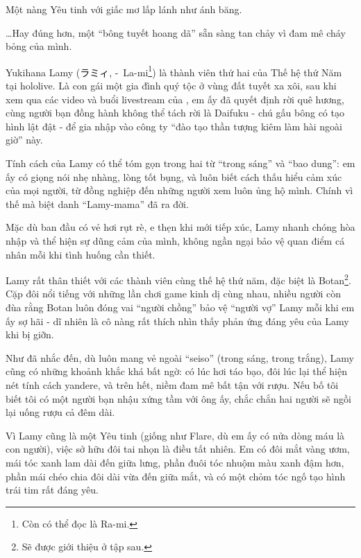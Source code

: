 \documentclass[../main.tex]{subfiles}
\begin{document}
Một nàng Yêu tinh với giấc mơ lấp lánh như ánh băng.

\dots Hay đúng hơn, một ``bông tuyết hoang dã'' sẵn sàng tan chảy vì đam mê cháy bỏng của mình.

\chrint


Yukihana Lamy (ラミィ, -\ La-mi\footnote{Còn có thể đọc là Ra-mi.}) là thành viên thứ hai của Thế hệ thứ Năm tại hololive. Là con gái một gia đình quý tộc ở vùng đất tuyết xa xôi, sau khi xem qua các video và buổi livestream của \hll, em ấy đã quyết định rời quê hương, cùng người bạn đồng hành không thể tách rời là Daifuku - chú gấu bông có tạo hình lật đật - để gia nhập vào công ty ``đào tạo thần tượng kiêm làm hài ngoài giờ'' này.

Tính cách của Lamy có thể tóm gọn trong hai từ ``trong sáng'' và ``bao dung'': em ấy có giọng nói nhẹ nhàng, lòng tốt bụng, và luôn biết cách thấu hiểu cảm xúc của mọi người, từ đồng nghiệp đến những người xem luôn ủng hộ mình. Chính vì thế mà biệt danh ``Lamy-mama'' đã ra đời.

Mặc dù ban đầu có vẻ hơi rụt rè, e thẹn khi mới tiếp xúc, Lamy nhanh chóng hòa nhập và thể hiện sự dũng cảm của mình, không ngần ngại bảo vệ quan điểm cá nhân mỗi khi tình huống cần thiết.

Lamy rất thân thiết với các thành viên cùng thế hệ thứ năm, đặc biệt là Botan\footnote{Sẽ được giới thiệu ở tập sau.}. Cặp đôi nổi tiếng với những lần chơi game kinh dị cùng nhau, nhiều người còn đùa rằng Botan luôn đóng vai ``người chồng'' bảo vệ ``người vợ'' Lamy mỗi khi em ấy sợ hãi - dĩ nhiên là cô nàng rất thích nhìn thấy phản ứng đáng yêu của Lamy khi bị giỡn.

Như đã nhắc đến, dù luôn mang vẻ ngoài ``seiso'' (trong sáng, trong trắng), Lamy cũng có những khoảnh khắc khá bất ngờ: có lúc hơi táo bạo, đôi lúc lại thể hiện nét tính cách yandere, và trên hết, niềm đam mê bất tận với rượu. Nếu bố tôi biết tôi có một người bạn nhậu xứng tầm với ông ấy, chắc chắn hai người sẽ ngồi lại uống rượu cả đêm dài.

Vì Lamy cũng là một Yêu tinh (giống như Flare, dù em ấy có nửa dòng máu là con người), việc sở hữu đôi tai nhọn là điều tất nhiên. Em có đôi mắt vàng ươm, mái tóc xanh lam dài đến giữa lưng, phần đuôi tóc nhuộm màu xanh đậm hơn, phần mái chéo chia đôi dài vừa đến giữa mắt, và có một chỏm tóc ngố tạo hình trái tim rất đáng yêu.
\end{document}
